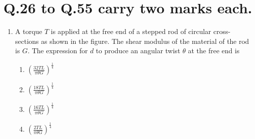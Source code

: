 \documentclass[journal]{IEEEtran}
\begin{document}
\section{Q.26 to Q.55 carry two marks each.}
\begin{enumerate}
	\item
	A torque $T$ is applied at the free end of a stepped rod of circular cross-sections as shown in the figure. The shear modulus of the material of the rod is $G$. The expression for $d$ to produce an angular twist $\theta$ at the free end is
	\begin{figure}[H]
    		\centering
    		
    		\caption{}
    		\label{36}
	\end{figure}
	
	\begin{enumerate}
		\item $\left(\frac{32TL}{\pi\theta G}\right)^{\frac{1}{4}}$
		\item $\left(\frac{18TL}{\pi\theta G}\right)^{\frac{1}{4}}$
		\item $\left(\frac{16TL}{\pi\theta G}\right)^{\frac{1}{4}}$
		\item $\left(\frac{2TL}{\pi\theta G}\right)^{\frac{1}{4}}$
	\end{enumerate}
\end{enumerate}
\end{document}
